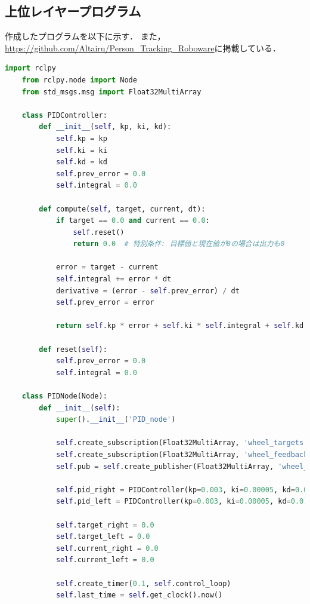 \subsection{上位レイヤープログラム}

作成したプログラムを以下に示す．
また，\url{https://github.com/Altairu/Person_Tracking_Roboware}に掲載している．

\begin{lstlisting}[language=Python, caption=PID\_node.py]
    import rclpy
    from rclpy.node import Node
    from std_msgs.msg import Float32MultiArray
    
    class PIDController:
        def __init__(self, kp, ki, kd):
            self.kp = kp
            self.ki = ki
            self.kd = kd
            self.prev_error = 0.0
            self.integral = 0.0
    
        def compute(self, target, current, dt):
            if target == 0.0 and current == 0.0:
                self.reset()
                return 0.0  # 特別条件: 目標値と現在値が0の場合は出力も0
    
            error = target - current
            self.integral += error * dt
            derivative = (error - self.prev_error) / dt
            self.prev_error = error
    
            return self.kp * error + self.ki * self.integral + self.kd * derivative
    
        def reset(self):
            self.prev_error = 0.0
            self.integral = 0.0
    
    class PIDNode(Node):
        def __init__(self):
            super().__init__('PID_node')
    
            self.create_subscription(Float32MultiArray, 'wheel_targets', self.target_callback, 10)
            self.create_subscription(Float32MultiArray, 'wheel_feedback', self.feedback_callback, 10)
            self.pub = self.create_publisher(Float32MultiArray, 'wheel_controls', 10)
    
            self.pid_right = PIDController(kp=0.003, ki=0.00005, kd=0.0)
            self.pid_left = PIDController(kp=0.003, ki=0.00005, kd=0.0)
    
            self.target_right = 0.0
            self.target_left = 0.0
            self.current_right = 0.0
            self.current_left = 0.0
    
            self.create_timer(0.1, self.control_loop)
            self.last_time = self.get_clock().now()
    

\end{lstlisting}
